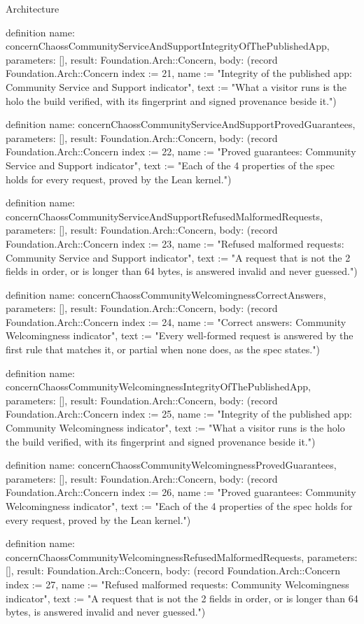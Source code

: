 \begin{lexlean}{Architecture}
\begin{semanticmodule}
definition{
  name: concernChaossCommunityServiceAndSupportIntegrityOfThePublishedApp,
  parameters: [],
  result: Foundation.Arch::Concern,
  body: (record Foundation.Arch::Concern {index := 21, name := "Integrity of the published app: Community Service and Support indicator", text := "What a visitor runs is the holo the build verified, with its fingerprint and signed provenance beside it."})
}

definition{
  name: concernChaossCommunityServiceAndSupportProvedGuarantees,
  parameters: [],
  result: Foundation.Arch::Concern,
  body: (record Foundation.Arch::Concern {index := 22, name := "Proved guarantees: Community Service and Support indicator", text := "Each of the 4 properties of the spec holds for every request, proved by the Lean kernel."})
}

definition{
  name: concernChaossCommunityServiceAndSupportRefusedMalformedRequests,
  parameters: [],
  result: Foundation.Arch::Concern,
  body: (record Foundation.Arch::Concern {index := 23, name := "Refused malformed requests: Community Service and Support indicator", text := "A request that is not the 2 fields in order, or is longer than 64 bytes, is answered invalid and never guessed."})
}

definition{
  name: concernChaossCommunityWelcomingnessCorrectAnswers,
  parameters: [],
  result: Foundation.Arch::Concern,
  body: (record Foundation.Arch::Concern {index := 24, name := "Correct answers: Community Welcomingness indicator", text := "Every well-formed request is answered by the first rule that matches it, or partial when none does, as the spec states."})
}

definition{
  name: concernChaossCommunityWelcomingnessIntegrityOfThePublishedApp,
  parameters: [],
  result: Foundation.Arch::Concern,
  body: (record Foundation.Arch::Concern {index := 25, name := "Integrity of the published app: Community Welcomingness indicator", text := "What a visitor runs is the holo the build verified, with its fingerprint and signed provenance beside it."})
}

definition{
  name: concernChaossCommunityWelcomingnessProvedGuarantees,
  parameters: [],
  result: Foundation.Arch::Concern,
  body: (record Foundation.Arch::Concern {index := 26, name := "Proved guarantees: Community Welcomingness indicator", text := "Each of the 4 properties of the spec holds for every request, proved by the Lean kernel."})
}

definition{
  name: concernChaossCommunityWelcomingnessRefusedMalformedRequests,
  parameters: [],
  result: Foundation.Arch::Concern,
  body: (record Foundation.Arch::Concern {index := 27, name := "Refused malformed requests: Community Welcomingness indicator", text := "A request that is not the 2 fields in order, or is longer than 64 bytes, is answered invalid and never guessed."})
}


\end{semanticmodule}
\end{lexlean}
